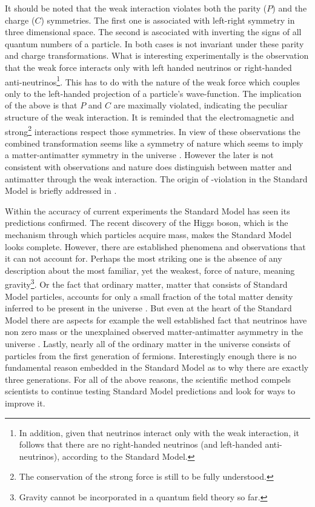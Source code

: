 It should be noted that the weak interaction violates both the parity ($P$) and the charge ($C$) symmetries.
The first one is associated with left-right symmetry in three dimensional space.
The second is ascociated with inverting the signs of all quantum numbers of a particle.
In both cases  is not invariant under these parity and charge transformations. What is interesting experimentally
is the observation \cite{wu-parity,garwin-parity} that the weak force interacts only with left handed neutrinos or right-handed
anti-neutrinos\footnote{In addition, given that neutrinos interact only with the weak interaction, it follows that there are no
right-handed neutrinos (and left-handed anti-neutrinos), according to the Standard Model.}. This has to do with the nature of
the weak force which couples only to the left-handed projection of a particle's
wave-function. The implication of the above is that $P$ and $C$ are maximally violated, indicating the
peculiar structure of the weak interaction. It is reminded that the electromagnetic and
strong\footnote{The \CP conservation of the strong force is still to be fully understood.} interactions
respect those symmetries. In view of these observations the combined \CP transformation
seems like a symmetry of nature which seems to imply a matter-antimatter symmetry in the universe \cite{Sakharov:1967dj}.
However the later is not consistent with observations and nature does distinguish between matter and antimatter through
the weak interaction. The origin of \CP-violation in the Standard Model is briefly addressed in .

Within the accuracy of current experiments the Standard Model has seen its predictions confirmed.
The recent discovery of the Higgs boson, which is the mechanism through which particles acquire mass, makes the Standard Model looks
complete. However, there are established phenomena and observations that it can not
account for. Perhaps the most striking one is the absence of any description about the most familiar, yet the weakest, force of nature,
meaning gravity\footnote{Gravity cannot be incorporated in a quantum field theory so far.}.
Or the fact that ordinary matter, \ie matter that consists of Standard Model particles, accounts for only a small
fraction of the total matter density inferred to be present in the universe \cite{dmatter-Hinshaw}. But even at the heart
of the Standard Model there are aspects for example the well established fact that neutrinos have non zero
mass \cite{nu-mass-superkam,nu-mass-kamland,nu-mass-sno,nu-mass-daya} or the unexplained observed
matter-antimatter asymmetry in the universe \cite{more-cpv-huet,more-cpv-gavela_I,more-cpv-gavela_II}.
Lastly, nearly all of the ordinary matter in the universe consists of
particles from the first generation of fermions. Interestingly enough there is no fundamental reason embedded in the Standard Model
as to why there are exactly three generations. For all of the above reasons, the scientific method compels scientists to continue
testing Standard Model predictions and look for ways to improve it.
